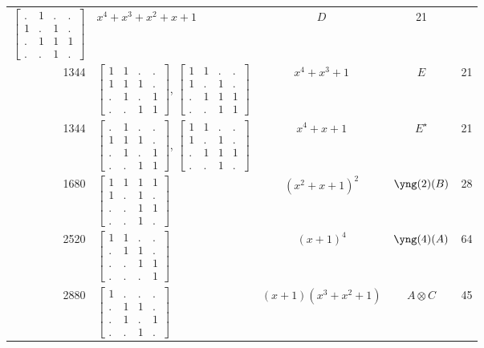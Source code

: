 \documentclass[11pt,oneside]{article}
\newcommand{\tensor}{\otimes}
\begin{document}
\begin{center}
\begin{tabular}{r|l|c|c|c}
$\begin{bmatrix}.&1&.&.\\1&.&1&.\\.&1&1&1\\.&.&1&.\end{bmatrix}$
& $x^4+x^3+x^2+x+1$  & $D$ & 21  \\
1344  & 
$\begin{bmatrix}1&1&.&.\\1&1&1&.\\.&1&.&1\\.&.&1&1\end{bmatrix}$,
$\begin{bmatrix}1&1&.&.\\1&.&1&.\\.&1&1&1\\.&.&1&1\end{bmatrix}$
& $x^4+x^3+1$        & $E$ & 21  \\
1344  & 
$\begin{bmatrix}.&1&.&.\\1&1&1&.\\.&1&.&1\\.&.&1&1\end{bmatrix}$,
$\begin{bmatrix}1&1&.&.\\1&.&1&.\\.&1&1&1\\.&.&1&.\end{bmatrix}$
& $x^4+x+1$          & $E^\star$ & 21  \\
1680  & $\begin{bmatrix}1&1&1&1\\1&.&1&.\\.&.&1&1\\.&.&1&.\end{bmatrix}$  & $(x^2+x+1)^2$  & $\yng(2)(B)$ & 28  \\
2520  & $\begin{bmatrix}1&1&.&.\\.&1&1&.\\.&.&1&1\\.&.&.&1\end{bmatrix}$  & $(x+1)^4$  & $\yng(4)(A)$ & 64   \\
2880  & $\begin{bmatrix}1&.&.&.\\.&1&1&.\\.&1&.&1\\.&.&1&.\end{bmatrix}$
  & $(x+1)(x^3+x^2+1)$  & $A\tensor C$ & 45   \\

\end{tabular}
\end{center}
\end{document}
